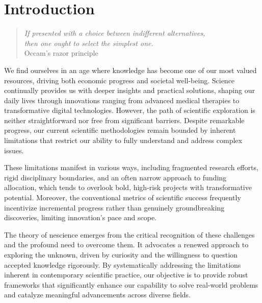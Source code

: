 %
%


\chapter{Introduction}
\label{chap:Introduction}

\begin{quote}
\begin{flushright}
\emph{If presented with a choice between indifferent alternatives,\\
then one ought to select the simplest one.}\\
Occam's razor principle 
\end{flushright}
\end{quote}
\bigskip

We find ourselves in an age where knowledge has become one of our most valued resources, driving both economic progress and societal well-being. Science continually provides us with deeper insights and practical solutions, shaping our daily lives through innovations ranging from advanced medical therapies to transformative digital technologies. However, the path of scientific exploration is neither straightforward nor free from significant barriers. Despite remarkable progress, our current scientific methodologies remain bounded by inherent limitations that restrict our ability to fully understand and address complex issues.

These limitations manifest in various ways, including fragmented research efforts, rigid disciplinary boundaries, and an often narrow approach to funding allocation, which tends to overlook bold, high-risk projects with transformative potential. Moreover, the conventional metrics of scientific success frequently incentivize incremental progress rather than genuinely groundbreaking discoveries, limiting innovation's pace and scope.

The theory of nescience emerges from the critical recognition of these challenges and the profound need to overcome them. It advocates a renewed approach to exploring the unknown, driven by curiosity and the willingness to question accepted knowledge rigorously. By systematically addressing the limitations inherent in contemporary scientific practice, our objective is to provide robust frameworks that significantly enhance our capability to solve real-world problems and catalyze meaningful advancements across diverse fields.

